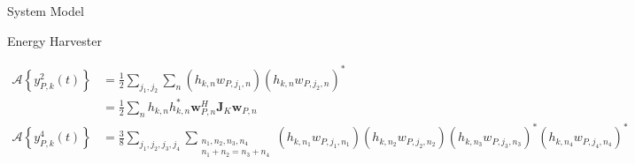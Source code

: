 \documentclass{IEEEtran}
\begin{document}
\begin{section}{System Model}
\begin{subsection}{Energy Harvester}
\begin{figure*}[b]
\begin{align}
				\mathcal{A}\left\{y_{P,k}^2(t)\right\}
				 & =\frac{1}{2}\sum_{j_1,j_2}\sum_n{(h_{k,n}w_{P,j_1,n})(h_{k,n}w_{P,j_2,n})^*}                                                                                                                                                                                                   \\
				 & =\frac{1}{2}\sum_n{h_{k,n}h_{k,n}^*{\boldsymbol{w}_{P,n}^H}{\boldsymbol{J}_{K}}{\boldsymbol{w}_{P,n}}}                                                                                                                                                                         \\
				\mathcal{A}\left\{y_{P,k}^4(t)\right\}
				 & =\frac{3}{8}\sum_{j_1,j_2,j_3,j_4}\sum_{\substack{{n_1},{n_2},{n_3},{n_4}\\{n_1}+{n_2}={n_3}+{n_4}}}{(h_{k,{n_1}}w_{P,{j_1},{n_1}})(h_{k,{n_2}}w_{P,{j_2},{n_2}})(h_{k,{n_3}}w_{P,{j_3},{n_3}})^*(h_{k,{n_4}}w_{P,{j_4},{n_4}})^*}                       \\

\end{align}
\end{figure*}
\end{subsection}
\end{section}
\end{document}
